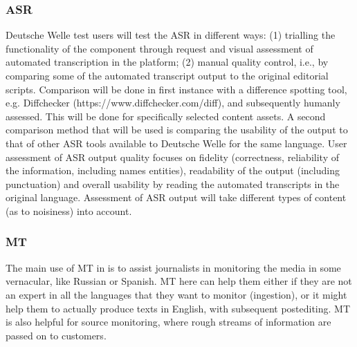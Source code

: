 \subsubsection{ASR\ins{)}}


Deutsche Welle test users will test the ASR in different ways: (1) trialling the functionality of the component through request and visual assessment of automated transcription in the platform; (2) manual quality control, i.e., by comparing some of the \SUMMA automated transcript output to the original editorial scripts.  Comparison will be done in first instance with a difference spotting tool, e.g. Diffchecker (https://www.diffchecker.com/diff), and subsequently humanly assessed. This will be done for specifically selected content assets. A second comparison method that will be used is comparing the usability of the output to that of other ASR tools available to Deutsche Welle for the same language. User assessment of ASR output quality focuses on fidelity (correctness, reliability of the information, including names entities), readability of the output (including punctuation) and overall usability by reading the automated transcripts in the original language. Assessment of ASR output will take different types of content (as to noisiness) into account.


\subsubsection{MT\ins{)}}
\label{sec:validation-mt}

 The main use of MT in \SUMMA is to assist journalists in monitoring the media in some vernacular, like Russian or Spanish. MT here can help them either if they are not an expert in all the languages that they want to monitor (ingestion), or it might help them to actually produce texts in English, with subsequent postediting. MT is also helpful for source monitoring, where rough streams of information are passed on to customers. 

